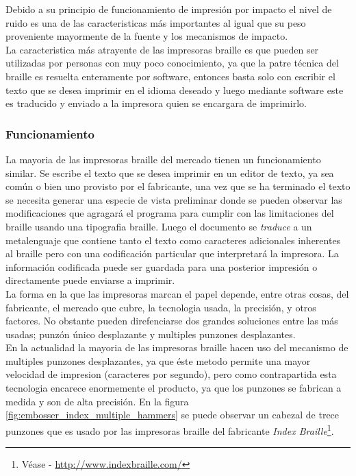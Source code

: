 Debido a su principio de funcionamiento de impresi\'on por impacto el nivel de
ruido es una de las caracteristicas m\'as importantes al igual que su peso
proveniente mayormente de la fuente y los mecanismos de impacto.\\

La caracteristica m\'as atrayente de las impresoras braille es que pueden ser
utilizadas por personas con muy poco conocimiento, ya que la patre t\'ecnica
del braille es resuelta enteramente por software, entonces basta solo con
escribir el texto que se desea imprimir en el idioma deseado y luego mediante
software este es traducido y enviado a la impresora quien se encargara de
imprimirlo.

\subsubsection{Funcionamiento}
%
La mayoria de las impresoras braille del mercado tienen un funcionamiento
similar. Se escribe el texto que se desea imprimir en un editor de texto, ya
sea com\'un o bien uno provisto por el fabricante, una vez que se ha terminado
el texto se necesita generar una especie de vista preliminar donde se pueden
observar las modificaciones que agragar\'a el programa para cumplir con las
limitaciones del braille usando una tipografia braille. Luego el documento se
\emph{traduce} a un metalenguaje que contiene tanto el texto como caracteres
adicionales inherentes al braille pero con una codificaci\'on particular que
interpretar\'a la impresora. La informaci\'on codificada puede ser guardada
para una posterior impresi\'on o directamente puede enviarse a imprimir.\\

La forma en la que las impresoras marcan el papel depende, entre otras cosas,
del fabricante, el mercado que cubre, la tecnologia usada, la precisi\'on, y
otros factores.  
No obstante pueden direfenciarse dos grandes soluciones entre las m\'as
usadas; punz\'on \'unico desplazante y multiples punzones desplazantes.\\

En la actualidad la mayoria de las impresoras braille hacen uso del mecanismo
de multiples punzones desplazantes, ya que \'este metodo permite una mayor
velocidad de impresion (caracteres por segundo), pero como contrapartida esta
tecnologia encarece enormemente el producto, ya que los punzones se fabrican a
medida y son de alta precisi\'on. En la figura
\ref{fig:embosser_index_multiple_hammers} se puede observar un cabezal de trece
punzones que es usado por las impresoras braille del fabricante \emph{Index
Braille}\footnote{V\'ease - \url{http://www.indexbraille.com/}}.

